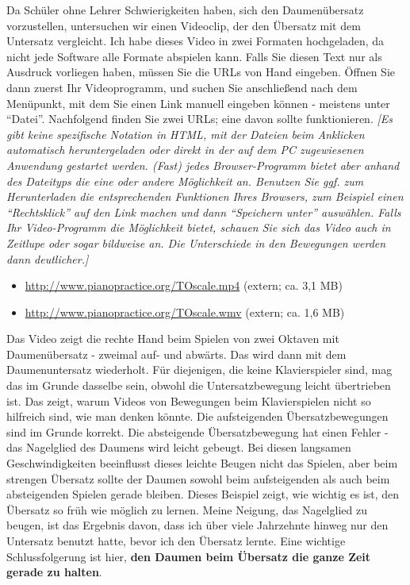 Da Schüler ohne Lehrer Schwierigkeiten haben, sich den Daumenübersatz vorzustellen, untersuchen wir einen Videoclip, der den Übersatz mit dem Untersatz vergleicht.
Ich habe dieses Video in zwei Formaten hochgeladen, da nicht jede Software alle Formate abspielen kann.
Falls Sie diesen Text nur als Ausdruck vorliegen haben, müssen Sie die URLs von Hand eingeben.
Öffnen Sie dann zuerst Ihr Videoprogramm, und suchen Sie anschließend nach dem Menüpunkt, mit dem Sie einen Link manuell eingeben können - meistens unter \enquote{Datei}.
Nachfolgend finden Sie zwei URLs; eine davon sollte funktionieren.
\textit{[Es gibt keine spezifische Notation in HTML, mit der Dateien beim Anklicken automatisch heruntergeladen oder direkt in der auf dem PC zugewiesenen Anwendung gestartet werden.
(Fast) jedes Browser-Programm bietet aber anhand des Dateityps die eine oder andere Möglichkeit an.
Benutzen Sie ggf. zum Herunterladen die entsprechenden Funktionen Ihres Browsers, zum Beispiel einen \enquote{Rechtsklick} auf den Link machen und dann \enquote{Speichern unter} auswählen.
Falls Ihr Video-Programm die Möglichkeit bietet, schauen Sie sich das Video auch in Zeitlupe oder sogar bildweise an.  Die Unterschiede in den Bewegungen werden dann deutlicher.]}

\begin{itemize} 
 \item \hyperref[http://www.pianopractice.org/TOscale.mp4]{http://www.pianopractice.org/TOscale.mp4} (extern; ca. 3,1 MB)
 \item \hyperref[http://www.pianopractice.org/TOscale.wmv]{http://www.pianopractice.org/TOscale.wmv} (extern; ca. 1,6 MB)
 \end{itemize}
Das Video zeigt die rechte Hand beim Spielen von zwei Oktaven mit Daumenübersatz - zweimal auf- und abwärts.
Das wird dann mit dem Daumenuntersatz wiederholt.
Für diejenigen, die keine Klavierspieler sind, mag das im Grunde dasselbe sein, obwohl die Untersatzbewegung leicht übertrieben ist.
Das zeigt, warum Videos von Bewegungen beim Klavierspielen nicht so hilfreich sind, wie man denken könnte.
Die aufsteigenden Übersatzbewegungen sind im Grunde korrekt.
Die absteigende Übersatzbewegung hat einen Fehler - das Nagelglied des Daumens wird leicht gebeugt.
Bei diesen langsamen Geschwindigkeiten beeinflusst dieses leichte Beugen nicht das Spielen, aber beim strengen Übersatz sollte der Daumen sowohl beim aufsteigenden als auch beim absteigenden Spielen gerade bleiben.
Dieses Beispiel zeigt, wie wichtig es ist, den Übersatz so früh wie möglich zu lernen.
Meine Neigung, das Nagelglied zu beugen, ist das Ergebnis davon, dass ich über viele Jahrzehnte hinweg nur den Untersatz benutzt hatte, bevor ich den Übersatz lernte.
Eine wichtige Schlussfolgerung ist hier, \textbf{den Daumen beim Übersatz die ganze Zeit gerade zu halten}.



